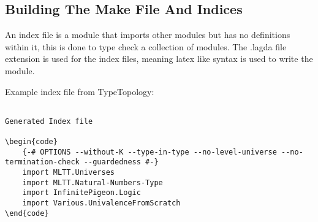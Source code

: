 
\subsection{Building The Make File And Indices} \label{sub:building make file and index }

An index file is a module that imports other modules but has no definitions
within it, this is done to type check a collection of modules. The
\textsf{.lagda} file extension is used for the index files, meaning latex like
syntax is used to write the module.

Example index file from TypeTopology:

\begin{lstlisting}
    
Generated Index file

\begin{code}
    {-# OPTIONS --without-K --type-in-type --no-level-universe --no-termination-check --guardedness #-}
    import MLTT.Universes
    import MLTT.Natural-Numbers-Type
    import InfinitePigeon.Logic
    import Various.UnivalenceFromScratch
\end{code}
\end{lstlisting}


